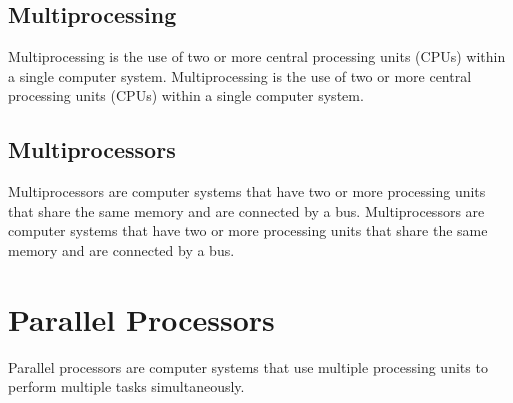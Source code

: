 \documentclass{article}
\begin{document}
\subsection*{Multiprocessing}
Multiprocessing is the use of two or more central processing units (CPUs) within a single computer system. Multiprocessing is the use of two or more central processing units (CPUs) within a single computer system.
\subsection*{Multiprocessors}
Multiprocessors are computer systems that have two or more processing units that share the same memory and are connected by a bus. Multiprocessors are computer systems that have two or more processing units that share the same memory and are connected by a bus.
\section*{Parallel Processors}
Parallel processors are computer systems that use multiple processing units to perform multiple tasks simultaneously. 
\end{document}
